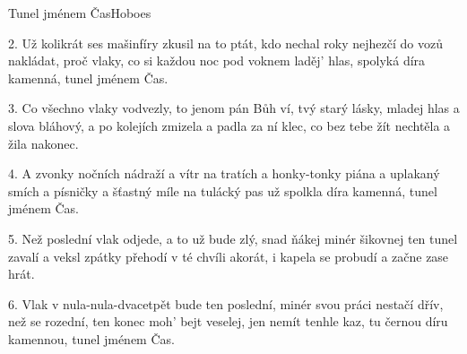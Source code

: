 \begin{song}{Tunel jménem Čas}{Hoboes}



\begin{xverse}{2. }
Už kolikrát ses mašinfíry zkusil na to ptát,
kdo nechal roky nejhezčí do vozů nakládat,
proč vlaky, co si každou noc pod voknem laděj' hlas,
spolyká díra kamenná, tunel jménem Čas.
\end{xverse}


\begin{xverse}{3. }
Co všechno vlaky vodvezly, to jenom pán Bůh ví,
tvý starý lásky, mladej hlas a slova bláhový,
a po kolejích zmizela a padla za ní klec,
co bez tebe žít nechtěla a žila nakonec.
\end{xverse}


\begin{xverse}{4. }
A zvonky nočních nádraží a vítr na tratích
a honky-tonky piána a uplakaný smích
a písničky a šťastný míle na tulácký pas
už spolkla díra kamenná, tunel jménem Čas.
\end{xverse}


\begin{xverse}{5. }
Než poslední vlak odjede, a to už bude zlý,
snad ňákej minér šikovnej ten tunel zavalí
a veksl zpátky přehodí v té chvíli akorát,
i kapela se probudí a začne zase hrát.
\end{xverse}


\begin{xverse}{6. }
Vlak v nula-nula-dvacetpět bude ten poslední,
minér svou práci nestačí dřív, než se rozední,
ten konec moh' bejt veselej, jen nemít tenhle kaz,
tu černou díru kamennou, tunel jménem Čas.
\end{xverse}

\end{song}


